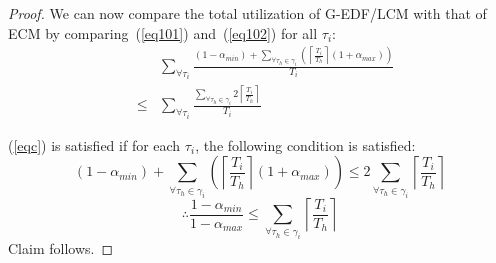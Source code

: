 \documentclass{sig-alternate}
\begin{document}
\begin{proof}
We can now compare the total utilization of G-EDF/LCM with that of ECM by comparing~(\ref{eq101}) and~(\ref{eq102}) for all $\tau_i$:
\begin{eqnarray}
& & \sum_{\forall \tau_{i}}\frac{(1-\alpha_{min})+\sum_{\forall \tau_{h}\in\gamma_{i}}\left(\left\lceil\frac{T_{i}}{T_{h}}\right\rceil(1+\alpha_{max})\right)}{T_{i}} \nonumber\\
& \le &   \sum_{\forall \tau_{i}}\frac{\sum_{\forall \tau_{h}\in\gamma_{i}}2\left\lceil\frac{T_{i}}{T_{h}}\right\rceil}{T_{i}}\label{eqc}\end{eqnarray}

(\ref{eqc}) is satisfied if for each $\tau_{i}$, the following condition is satisfied:
\begin{equation*}
(1-\alpha_{min})+\sum_{\forall \tau_h \in \gamma_i}\left(\left\lceil\frac{T_{i}}{T_{h}}\right\rceil(1+\alpha_{max})\right)  \le  2\sum_{\forall \tau_h \in \gamma_i}\left\lceil\frac{T_{i}}{T_{h}}\right\rceil
\end{equation*}
\begin{equation*}
\therefore\frac{1-\alpha_{min}}{1-\alpha_{max}}  \le  \sum_{\forall \tau_h \in \gamma_i}\left\lceil\frac{T_{i}}{T_{h}}\right\rceil
\end{equation*}
Claim follows.
\end{proof}

\end{document}
